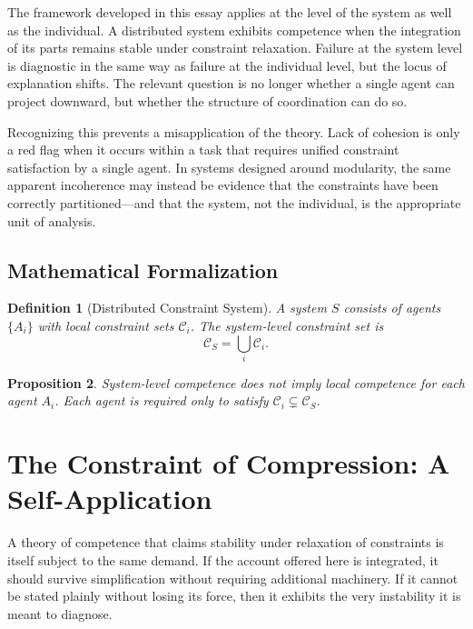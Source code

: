 \documentclass[12pt, a4paper]{article}
\newtheorem{definition}{Definition}[section]
\newtheorem{proposition}[definition]{Proposition}
\begin{document}
The framework developed in this essay applies at the level of the system as well as the individual. A distributed system exhibits competence when the integration of its parts remains stable under constraint relaxation. Failure at the system level is diagnostic in the same way as failure at the individual level, but the locus of explanation shifts. The relevant question is no longer whether a single agent can project downward, but whether the structure of coordination can do so.

Recognizing this prevents a misapplication of the theory. Lack of cohesion is only a red flag when it occurs within a task that requires unified constraint satisfaction by a single agent. In systems designed around modularity, the same apparent incoherence may instead be evidence that the constraints have been correctly partitioned---and that the system, not the individual, is the appropriate unit of analysis.

\subsection*{Mathematical Formalization}

\begin{definition}[Distributed Constraint System]
A system $S$ consists of agents $\{A_i\}$ with local constraint sets $\mathcal{C}_i$. The system-level constraint set is
\[
\mathcal{C}_S = \bigcup_i \mathcal{C}_i.
\]
\end{definition}

\begin{proposition}
System-level competence does not imply local competence for each agent $A_i$. Each agent is required only to satisfy $\mathcal{C}_i \subsetneq \mathcal{C}_S$.
\end{proposition}


\section{The Constraint of Compression: A Self-Application}

A theory of competence that claims stability under relaxation of constraints is itself subject to the same demand. If the account offered here is integrated, it should survive simplification without requiring additional machinery. If it cannot be stated plainly without losing its force, then it exhibits the very instability it is meant to diagnose.
\end{document}
